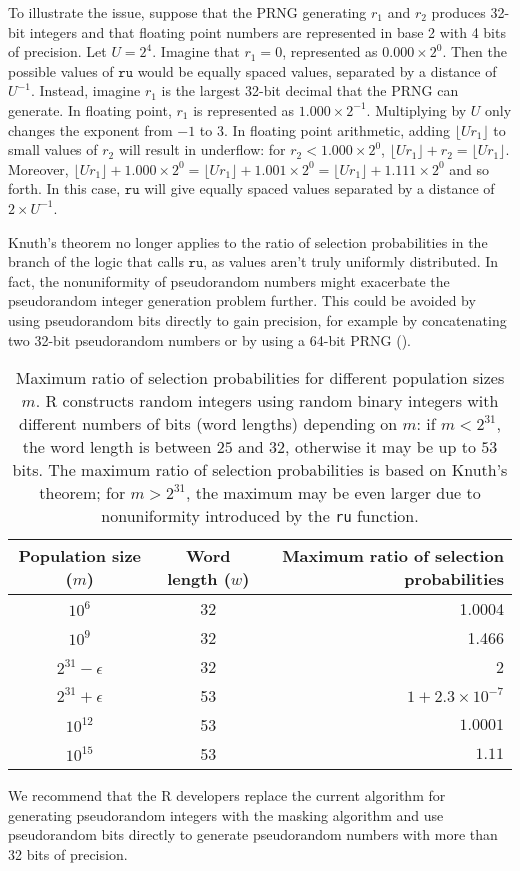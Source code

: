 \documentclass[12pt]{article}
\begin{document}
To illustrate the issue, suppose that the PRNG generating $r_1$ and $r_2$ produces 32-bit integers and that floating point numbers 
are represented in base 2 with 4 bits of precision.
Let $U=2^4$.
Imagine that $r_1 = 0$, represented as $0.000 \times 2^0$.
Then the possible values of $\texttt{ru}$ would be equally spaced values, separated by a distance of $U^{-1}$.
Instead, imagine $r_1$ is the largest 32-bit decimal that the PRNG can generate.
In floating point, $r_1$ is represented as $1.000 \times 2^{-1}$.
Multiplying by $U$ only changes the exponent from $-1$ to $3$.
In floating point arithmetic, adding $\lfloor U r_1 \rfloor$ to small values of $r_2$ will result in underflow:
for $r_2 < 1.000 \times 2^{0}$, $\lfloor U r_1 \rfloor + r_2 = \lfloor U r_1 \rfloor$. 
Moreover, $\lfloor U r_1 \rfloor + 1.000 \times 2^{0} = \lfloor U r_1 \rfloor + 1.001 \times 2^{0} = \lfloor U r_1 \rfloor + 1.111 \times 2^{0}$ and so forth.
In this case, $\texttt{ru}$ will give equally spaced values separated by a distance of $2\times U^{-1}$.

Knuth's theorem no longer applies to the ratio of selection probabilities in the branch of the logic that calls $\texttt{ru}$, as values aren't truly uniformly distributed.
In fact, the nonuniformity of pseudorandom numbers might exacerbate the pseudorandom integer generation problem further.
This could be avoided by using pseudorandom bits directly to gain precision, for example by
concatenating two 32-bit pseudorandom numbers or by using a 64-bit PRNG (\cite{marsaglia_64bit_2004}).

\begin{table}[h]
\caption{Maximum ratio of selection probabilities for different population sizes $m$. 
R constructs random integers using random binary integers with different numbers of bits (word lengths) depending on $m$:
if $m < 2^{31}$, the word length is between $25$ and $32$, otherwise it may be up to $53$ bits.
The maximum ratio of selection probabilities is based on Knuth's theorem; 
for $m > 2^{31}$, the maximum may be even larger due to nonuniformity introduced by the \texttt{ru} function.
}
\begin{center}
\begin{tabular}{|c|c|r|}

\hline
Population size ($m$) & Word length ($w$) & Maximum ratio of selection probabilities\\
\hline 
$10^6$ & 32 & 1.0004 \\
$10^9$ & 32 & 1.466 \\
 $2^{31}-\epsilon$ & 32 & 2 \\
$2^{31}+\epsilon$ & 53 & $1 + 2.3 \times 10^{-7}$ \\
$10^{12}$ & 53 & $1.0001$ \\
$10^{15}$ & 53 & $1.11$ \\
\hline

\end{tabular}
\end{center}
\label{tab}
\end{table}%

We recommend that the R developers replace the current algorithm for generating pseudorandom integers with the masking algorithm
and use pseudorandom bits directly to generate pseudorandom numbers with more than 32 bits of precision.



\end{document}

